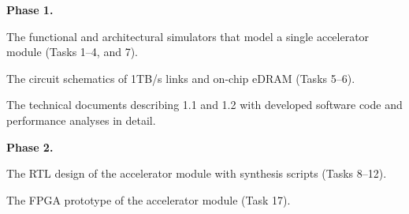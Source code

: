 


\noindent
\textbf{Phase 1.}

 The functional and architectural simulators that model a single accelerator module (Tasks 1--4, and 7).

 The circuit schematics of 1TB/s links and on-chip eDRAM (Tasks 5--6). 

 The technical documents describing 1.1 and 1.2 with developed software code and performance analyses in detail.

\noindent
\textbf{Phase 2.}

 The RTL design of the accelerator module with synthesis scripts (Tasks 8--12).

 The FPGA prototype of the accelerator module (Task 17).

